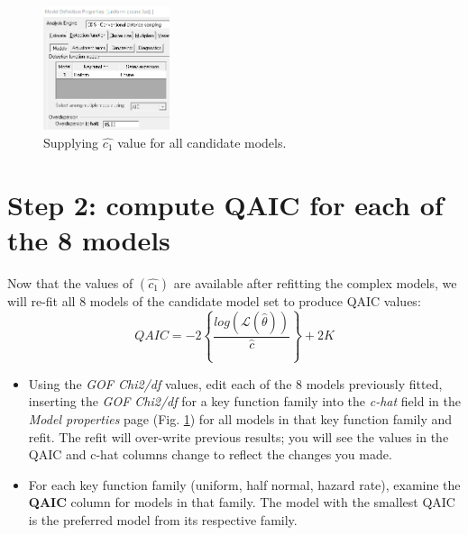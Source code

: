 \documentclass[a4paper, 10pt]{article}
\begin{document}
\begin{figure}
\includegraphics[width=0.33\textwidth]{images/chat-input.png}
\caption{Supplying $\hat{c_1}$ value for all candidate models. \label{fig:chat}}
\vspace{-25pt}
\end{figure}

\section{Step 2: compute QAIC for each of the 8 models}

Now that the values of $(\hat{c_1})$ are available after refitting the complex models, we will re-fit all 8 models of the candidate model set to produce QAIC values:
$$QAIC = -2 \left \{ \frac{log(\mathcal{L}(\hat{\theta}))}{\hat{c}} \right \} + 2K$$

\begin{itemize}
	\item Using the \emph{GOF Chi2/df} values, edit each of the 8 models previously fitted, inserting the \emph{GOF Chi2/df} for a key function family into the \emph{c-hat} field in the \emph{Model properties} page (Fig. \ref{fig:chat}) for all models in that key function family and refit.  The refit will over-write previous results; you will see the values in the QAIC and c-hat columns change to reflect the changes you made.
	\item For each key function family (uniform, half normal, hazard rate), examine the \textbf{QAIC} column for models in that family.  The model with the smallest QAIC is the preferred model from its respective family.
\end{itemize}


{
}
\end{document}
